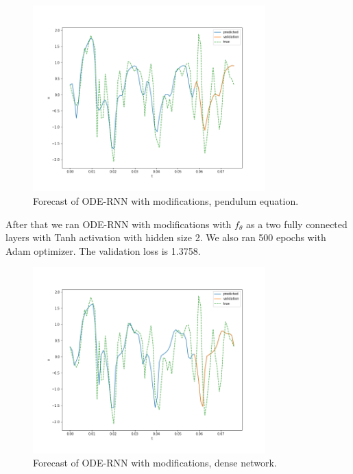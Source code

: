 \documentclass[../../main.tex]{subfiles}
\begin{document}
\begin{figure}[H]
\centering
\includegraphics[width=0.8\textwidth]{figures/pendulum.png}
\caption{Forecast of ODE-RNN with modifications, pendulum equation.}
\end{figure}

After that we ran ODE-RNN with modifications with $f_\theta$ as a two fully connected layers with Tanh activation with hidden size 2. We also ran 500 epochs with Adam optimizer. The validation loss is 1.3758.


\begin{figure}[H]
\centering
\includegraphics[width=0.8\textwidth]{figures/dense.png}
\caption{Forecast of ODE-RNN with modifications,  dense network.}
\end{figure}
\end{document}
